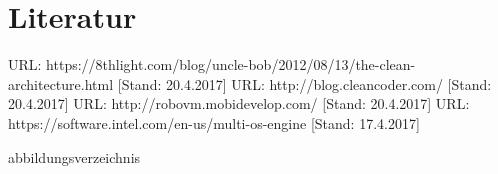 \documentclass[a4paper,10pt,xetex]{article}
\begin{document}
\newpage
\section{Literatur}\label{literatur}
\begingroup
\renewcommand{\section}[2]{}%
  \begin{thebibliography}{9}
     URL: https://8thlight.com/blog/uncle-bob/2012/08/13/the-clean-architecture.html [Stand: 20.4.2017]
     URL: http://blog.cleancoder.com/ [Stand: 20.4.2017]
     URL: http://robovm.mobidevelop.com/ [Stand: 20.4.2017]
     URL: https://software.intel.com/en-us/multi-os-engine [Stand: 17.4.2017]
  \end{thebibliography}
\endgroup

\section{Abbildungsverzeichnis}\label{abbildungsverzeichnis}
\begingroup
\renewcommand{\section}[2]{}%
\hypersetup{linkcolor=black}
\listoffigures
\endgroup
\end{document}
